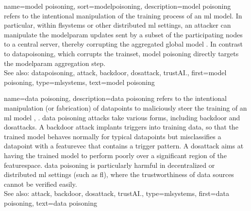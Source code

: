 {name={model poisoning}, 
sort={modelpoisoning}, 
	description={\Gls{model} poisoning refers to the intentional 
		manipulation of the \gls{training} process of an \gls{ml} \gls{model}. 
		In particular, within \glspl{flsystem} or other distributed \gls{ml} settings, 
		an attacker can manipulate the \gls{modelparam} updates sent by a subset of 
		the participating nodes to a central server, thereby corrupting the aggregated 
		global \gls{model} \cite{FLARE2022}. In contrast to \gls{datapoisoning}, which 
		corrupts the \gls{trainset}, model poisoning directly targets the 
		\gls{modelparam} aggregation step.
				\\
		See also: \gls{datapoisoning}, \gls{attack}, \gls{backdoor}, \gls{dosattack}, \gls{trustAI}.},
	first={model poisoning},
	type=mlsystems,
	text={model poisoning} 
}

{name={data poisoning}, 
	description={\Gls{data} poisoning refers to the intentional 
		manipulation (or fabrication) of \glspl{datapoint} to maliciously 
		steer the \gls{training} of an \gls{ml} \gls{model} \cite{Liu2021}, \cite{PoisonGAN}. 
  		\Gls{data} poisoning \glspl{attack} take various forms, including 
		\gls{backdoor} and \glspl{dosattack}. A \gls{backdoor} \gls{attack} 
		implants triggers into \gls{training} \gls{data}, so that the trained \gls{model} 
		behaves normally for typical \glspl{datapoint} but misclassifies a 
		\gls{datapoint} with a \gls{featurevec} that contains a trigger pattern.
  		A \gls{dosattack} aims at having the trained \gls{model} to perform 
		poorly over a significant region of the \gls{featurespace}. 
		\Gls{data} poisoning is particularly harmful in decentralized or 
		distributed \gls{ml} settings (such as \gls{fl}), where the 
		trustworthiness of \gls{data} sources cannot be verified easily.
				\\
		See also: \gls{attack}, \gls{backdoor}, \gls{dosattack}, \gls{trustAI}.},
	type=mlsystems,
	first={data poisoning},
	text={data poisoning} 
}

